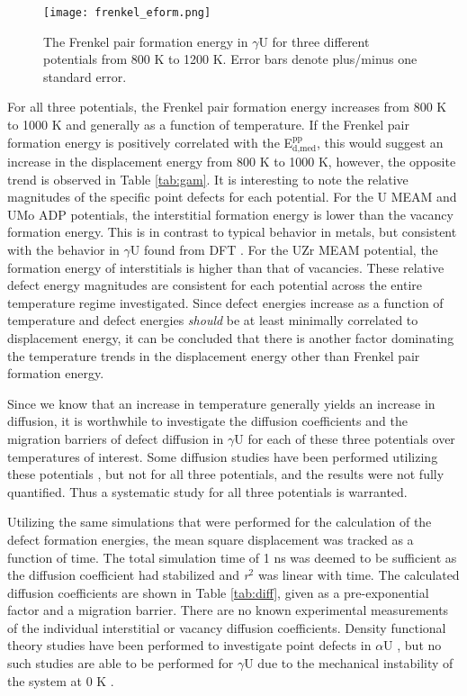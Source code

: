 \documentclass[review]{elsarticle}
\begin{document}
\begin{figure}[h]
 \centering
 \texttt{[image: frenkel\_eform.png]} 
 \caption{The Frenkel pair formation energy in $\gamma$U for three different potentials from 800 K to 1200 K. Error bars denote plus/minus one standard error.}
 \label{fig:eform}
\end{figure}

\FloatBarrier

For all three potentials, the Frenkel pair formation energy increases from 800 K to 1000 K and generally as a function of temperature. If the Frenkel pair formation energy is positively correlated with the E$^{\textrm{pp}}_{\textrm{d,med}}$, this would suggest an increase in the displacement energy from 800 K to 1000 K, however, the opposite trend is observed in Table \ref{tab:gam}. It is interesting to note the relative magnitudes of the specific point defects for each potential. For the U MEAM and UMo ADP potentials, the interstitial formation energy is lower than the vacancy formation energy. This is in contrast to typical behavior in metals, but consistent with the behavior in $\gamma$U found from DFT \cite{beeler2010}. For the UZr MEAM potential, the formation energy of interstitials is higher than that of vacancies. These relative defect energy magnitudes are consistent for each potential across the entire temperature regime investigated. Since defect energies increase as a function of temperature and defect energies \textit{should} be at least minimally correlated to displacement energy, it can be concluded that there is another factor dominating the temperature trends in the displacement energy other than Frenkel pair formation energy.

\FloatBarrier

Since we know that an increase in temperature generally yields an increase in diffusion, it is worthwhile to investigate the diffusion coefficients and the migration barriers of defect diffusion in $\gamma$U for each of these three potentials over temperatures of interest. Some diffusion studies have been performed utilizing these potentials \cite{smirnovaADP, smirnova2015}, but not for all three potentials, and the results were not fully quantified. Thus a systematic study for all three potentials is warranted.

Utilizing the same simulations that were performed for the calculation of the defect formation energies, the mean square displacement was tracked as a function of time. The total simulation time of 1 ns was deemed to be sufficient as the diffusion coefficient had stabilized and \textit{r}$^{2}$ was linear with time. The calculated diffusion coefficients are shown in Table \ref{tab:diff}, given as a pre-exponential factor and a migration barrier. There are no known experimental measurements of the individual interstitial or vacancy diffusion coefficients. Density functional theory studies have been performed to investigate point defects in $\alpha$U \cite{wirth2011}, but no such studies are able to be performed for $\gamma$U due to the mechanical instability of the system at 0 K \cite{beeler2010}.
\end{document}
